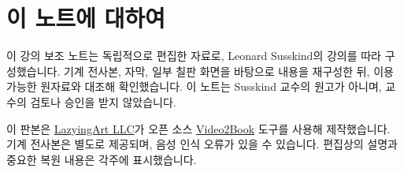 \documentclass[11pt,oneside]{book}
\begin{document}
\frontmatter
\hypersetup{pageanchor=false}

\hypersetup{pageanchor=true}

\clearpage
\chapter{이 노트에 대하여}
이 강의 보조 노트는 독립적으로 편집한 자료로, Leonard Susskind의 강의를 따라 구성했습니다. 기계 전사본, 자막, 일부 칠판 화면을 바탕으로 내용을 재구성한 뒤, 이용 가능한 원자료와 대조해 확인했습니다. 이 노트는 Susskind 교수의 원고가 아니며, 교수의 검토나 승인을 받지 않았습니다.

이 판본은 \href{https://lazying.art}{LazyingArt LLC}가 오픈 소스 \href{https://github.com/lachlanchen/Video2Book}{Video2Book} 도구를 사용해 제작했습니다. 기계 전사본은 별도로 제공되며, 음성 인식 오류가 있을 수 있습니다. 편집상의 설명과 중요한 복원 내용은 각주에 표시했습니다.
\clearpage
\tableofcontents
\mainmatter









\end{document}
